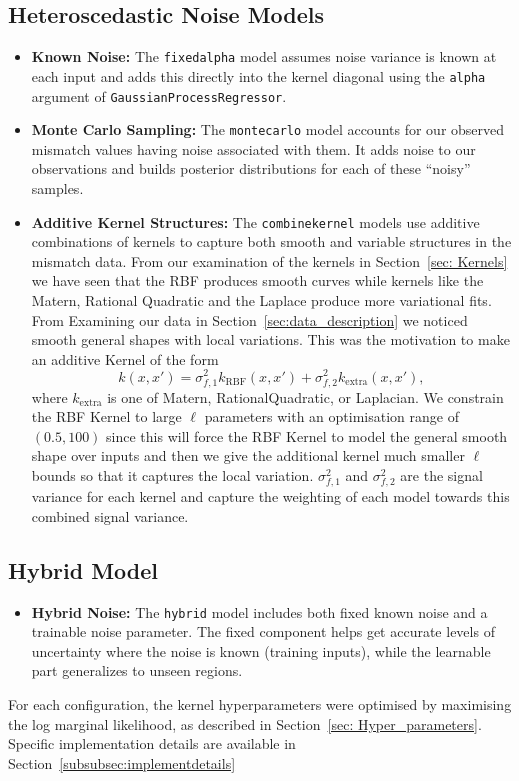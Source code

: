 \documentclass{ucdgradtaughtthesis}
\begin{document}
\subsection{Heteroscedastic Noise Models}
\begin{itemize}
    \item \textbf{Known Noise:} The \texttt{fixedalpha} model assumes noise variance is known at each input and adds this directly into the kernel diagonal using the \texttt{alpha} argument of \texttt{GaussianProcessRegressor}.
    \item \textbf{Monte Carlo Sampling:} The \texttt{montecarlo} model accounts for our observed mismatch values having noise associated with them. It adds noise to our observations and builds posterior distributions for each of these ``noisy'' samples. 
    \item \textbf{Additive Kernel Structures:} The \texttt{combinekernel} models use additive combinations of kernels to capture both smooth and variable structures in the mismatch data. From our examination of the kernels in Section~\ref{sec: Kernels} we have seen that the RBF produces smooth curves while kernels like the Matern, Rational Quadratic and the Laplace produce more variational fits.
            From Examining our data in Section~\ref{sec:data_description} we noticed smooth general shapes with local variations. This was the motivation to make an additive Kernel of the form 
    \begin{equation}
        k(x, x') = \sigma_{f,1}^2k_{\mathrm{RBF}}(x, x') + \sigma_{f,2}^2k_{\mathrm{extra}}(x, x'),
    \end{equation}
    where \(k_{\mathrm{extra}}\) is one of Matern, RationalQuadratic, or Laplacian. We constrain the RBF Kernel to large \(\ell\) parameters with an optimisation range of \((0.5,100)\) since this will force the RBF Kernel to model the general smooth shape over inputs
    and then we give the additional kernel much smaller \(\ell\) bounds so that it captures the local variation. \(\sigma_{f,1}^2\) and \(\sigma_{f,2}^2\) are the signal variance for each kernel and capture the weighting of each model towards this combined signal variance.
\end{itemize}
%
%

\noindent
\subsection{Hybrid Model}
\begin{itemize}
    \item \textbf{Hybrid Noise:} The \texttt{hybrid} model includes both fixed known noise and a trainable noise parameter. The fixed component helps get accurate levels of uncertainty where the noise is known (training inputs), while the learnable part generalizes to unseen regions.
\end{itemize}
%
For each configuration, the kernel hyperparameters were optimised by maximising the log marginal likelihood, as described in Section~\ref{sec: Hyper_parameters}. 
Specific implementation details are available in Section~\ref{subsubsec:implementdetails}
%
%
%
\end{document}

